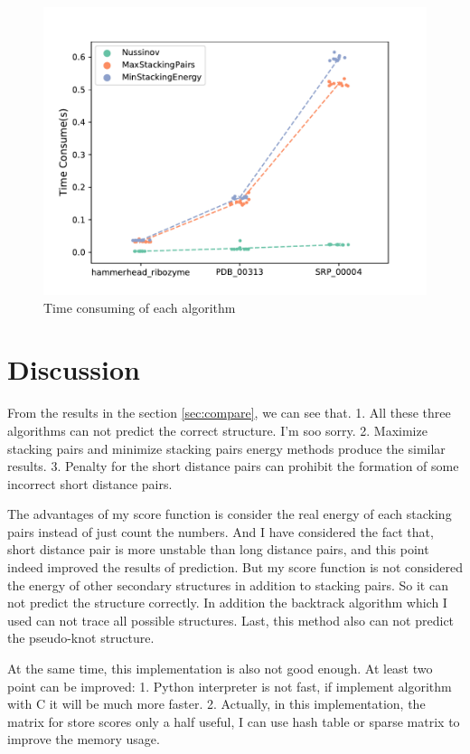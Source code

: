 \documentclass[10pt]{article}
\begin{document}
\begin{figure}[h]
    \includegraphics[width=\linewidth]{./img/time_consume.pdf}
    \caption{Time consuming of each algorithm}
    \label{fig:time_consuming}
\end{figure}

\section{Discussion}
\label{discussion}

From the results in the section \ref{sec:compare},
we can see that. 1. All these three algorithms can not predict the correct structure. I'm soo sorry.
2. Maximize stacking pairs and minimize stacking pairs energy methods produce the similar results.
3. Penalty for the short distance pairs can prohibit the formation of some incorrect short distance pairs.

The advantages of my score function is consider the real energy of each stacking pairs 
instead of just count the numbers. And I have considered the fact that, 
short distance pair is more unstable than long distance pairs, and this point indeed improved the results of prediction.
But my score function is not considered the energy of other secondary structures in addition to stacking pairs.
So it can not predict the structure correctly.
In addition the backtrack algorithm which I used can not trace all possible structures.
Last, this method also can not predict the pseudo-knot structure.

At the same time, this implementation is also not good enough. At least two point can be improved: 
1. Python interpreter is not fast, if implement algorithm with C it will be much more faster.
2. Actually, in this implementation, the matrix for store scores only a half useful,
I can use hash table or sparse matrix to improve the memory usage.
\end{document}
